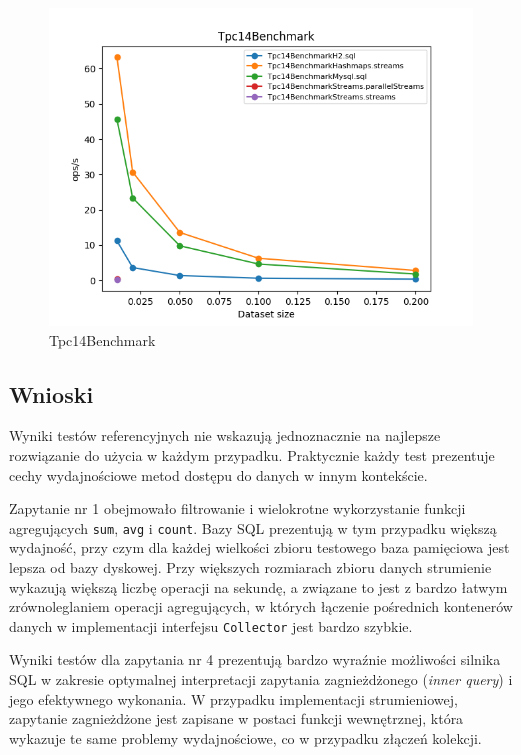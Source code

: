\documentclass[12pt]{extarticle}
\begin{document}
\begin{figure}[H]
\centering
\includegraphics[width=15cm]{plots/Tpc14Benchmark}
\caption{Tpc14Benchmark}
\end{figure}


\subsection{Wnioski}

    Wyniki testów referencyjnych nie wskazują jednoznacznie na najlepsze rozwiązanie do użycia w każdym przypadku. Praktycznie każdy test prezentuje cechy wydajnościowe metod dostępu do danych w innym kontekście.

    Zapytanie nr 1 obejmowało filtrowanie i wielokrotne wykorzystanie funkcji agregujących \texttt{sum}, \texttt{avg} i \texttt{count}. Bazy SQL prezentują w tym przypadku większą wydajność, przy czym dla każdej wielkości zbioru testowego baza pamięciowa jest lepsza od bazy dyskowej. Przy większych rozmiarach zbioru danych strumienie wykazują większą liczbę operacji na sekundę, a związane to jest z bardzo łatwym zrównoleglaniem operacji agregujących, w których łączenie pośrednich kontenerów danych w implementacji interfejsu \texttt{Collector} jest bardzo szybkie.

    Wyniki testów dla zapytania nr 4 prezentują bardzo wyraźnie możliwości silnika SQL w zakresie optymalnej interpretacji zapytania zagnieżdżonego (\textit{inner query}) i jego efektywnego wykonania. W przypadku implementacji strumieniowej, zapytanie zagnieżdżone jest zapisane w postaci funkcji wewnętrznej, która wykazuje te same problemy wydajnościowe, co w przypadku złączeń kolekcji. 
\end{document}
